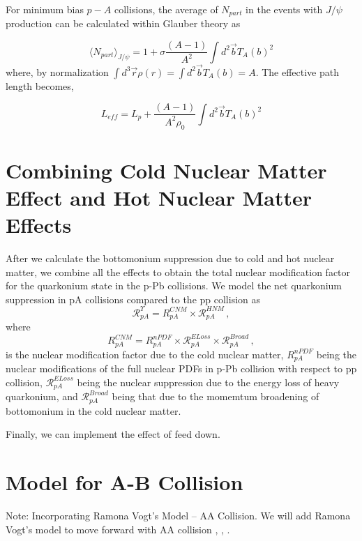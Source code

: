 \documentclass[11pt,onecolumn]{article}
\newcommand{\beq}{\begin{equation}}
\newcommand{\eeq}{\end{equation}}
\begin{document}
For minimum bias $p-A$ collisions, the average of $N_{part}$ in the events with $J/\psi$ production can be calculated within Glauber theory as

\beq
    \langle{N_{part}}\rangle_{J/\psi} = 1 + \sigma \frac{(A-1)}{A^2} \int d^2 \vec{b} T_A(b)^2
\eeq
where, by normalization $\int d^3 \vec{r} \rho(r) = \int d^2 \vec{b} T_A(b) = A$. The effective path length becomes,

\beq
    L_{eff} =  L_p +  \frac{(A-1)}{A^2 \rho_0} \int d^2 \vec{b} T_A(b)^2
\eeq

\section{Combining Cold Nuclear Matter Effect and Hot Nuclear Matter Effects}
After we calculate the bottomonium suppression due to cold and hot nuclear matter, we combine all the effects to obtain the total nuclear modification factor for the quarkonium state in the p-Pb collisions. We model the net quarkonium suppression in pA collisions compared to the pp collision as
\beq
\mathcal{R}^{\Upsilon}_{pA} = {R}^{CNM}_{pA}  \times  \mathcal{R}^{HNM}_{pA} \, ,
\eeq
%
where 
%
\beq
{R}^{CNM}_{pA} = {R}^{nPDF}_{pA} 
 \times \mathcal{R}^{E Loss}_{pA} \times  \mathcal{R}^{Broad}_{pA} \, ,
\eeq
%
is the nuclear modification factor due to the cold nuclear matter, ${R}^{nPDF}_{pA}$ being the nuclear modifications of the full nuclear PDFs in p-Pb collision with respect to pp collision, $\mathcal{R}^{E Loss}_{pA}$ being the nuclear suppression due to the energy loss of heavy quarkonium, and $\mathcal{R}^{Broad}_{pA}$ being that due to the momemtum broadening of bottomonium in the cold nuclear matter.  

Finally, we can implement the effect of feed down.



\section{Model for A-B Collision}
%
Note: Incorporating Ramona Vogt's Model -- AA Collision. We will add Ramona Vogt's model to move forward with AA collision \cite{Vogt:2010aa}, \cite{Arleo:2014oha}, \cite{Andronic:2015wma}.
\end{document}

